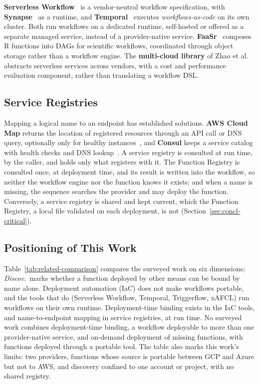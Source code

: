 \textbf{Serverless Workflow}~\cite{serverlessWorkflowSpec} is a vendor-neutral workflow
specification, with \textbf{Synapse}~\cite{serverlessworkflowSynapse} as a runtime, and
\textbf{Temporal}~\cite{temporalPlatform} executes \textit{workflows-as-code} on its own cluster.
Both run workflows on a dedicated runtime, self-hosted or offered as a separate managed service,
instead of a provider-native service. \textbf{FaaSr}~\cite{park2024faasr} composes R functions into DAGs for scientific
workflows, coordinated through object storage rather than a workflow engine. The \textbf{multi-cloud
library} of Zhao et al.~\cite{zhao2022supporting} abstracts serverless services across vendors,
with a cost and performance evaluation component, rather than translating a workflow DSL.

\subsection{Service Registries}

Mapping a logical name to an endpoint has established solutions. \textbf{AWS Cloud Map} returns
the location of registered resources through an API call or DNS query, optionally only for healthy
instances~\cite{awsCloudMap}, and \textbf{Consul} keeps a service catalog with health checks and
DNS lookup~\cite{consulServiceDiscovery}. A service registry is consulted at run time, by the
caller, and holds only what registers with it. The Function Registry is consulted once, at
deployment time, and its result is written into the workflow, so neither the workflow engine nor
the function knows it exists; and when a name is missing, the sequence searches the provider and may
deploy the function. Conversely, a service registry is shared and kept current, which the Function
Registry, a local file validated on each deployment, is not (Section~\ref{sec:concl-critical}).

\subsection{Positioning of This Work}

Table~\ref{tab:related-comparison} compares the surveyed work on six dimensions; \emph{Discov.}\
marks whether a function deployed by other means can be bound by name alone. Deployment automation
(IaC) does not make workflows portable, and the tools that do (Serverless Workflow, Temporal,
Triggerflow, xAFCL) run workflows on their own runtime. Deployment-time binding exists in the IaC
tools, and name-to-endpoint mapping in service registries, at run time. No surveyed work combines
deployment-time binding, a workflow deployable to more than one provider-native service, and
on-demand deployment of missing functions, with functions deployed through a portable tool. The
table also marks this work's limits: two providers, functions whose source is portable between GCP
and Azure but not to AWS, and discovery confined to one account or project, with no shared
registry.

